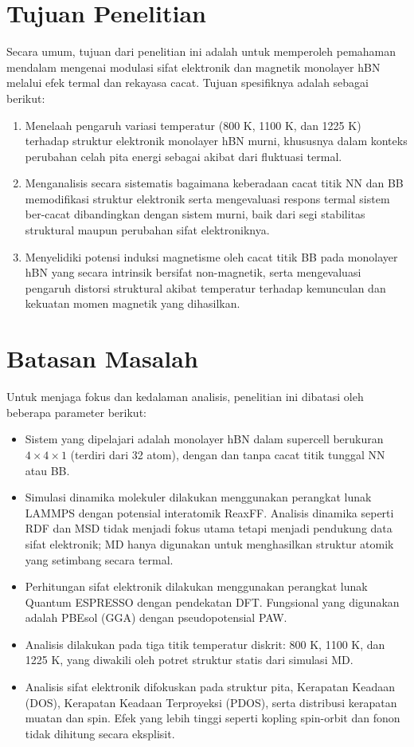 \section{Tujuan Penelitian}
Secara umum, tujuan dari penelitian ini adalah untuk memperoleh pemahaman mendalam mengenai modulasi sifat elektronik dan magnetik monolayer hBN melalui efek termal dan rekayasa cacat. Tujuan spesifiknya adalah sebagai berikut:
\begin{enumerate}
\item Menelaah pengaruh variasi temperatur (800 K, 1100 K, dan 1225 K) terhadap struktur elektronik monolayer hBN murni, khususnya dalam konteks perubahan celah pita energi sebagai akibat dari fluktuasi termal.

\item Menganalisis secara sistematis bagaimana keberadaan cacat titik NN dan BB memodifikasi struktur elektronik serta mengevaluasi respons termal sistem ber-cacat dibandingkan dengan sistem murni, baik dari segi stabilitas struktural maupun perubahan sifat elektroniknya.

\item Menyelidiki potensi induksi magnetisme oleh cacat titik BB pada monolayer hBN yang secara intrinsik bersifat non-magnetik, serta mengevaluasi pengaruh distorsi struktural akibat temperatur terhadap kemunculan dan kekuatan momen magnetik yang dihasilkan.
\end{enumerate}

\section{Batasan Masalah}
Untuk menjaga fokus dan kedalaman analisis, penelitian ini dibatasi oleh beberapa parameter berikut:
\begin{itemize}
    \item Sistem yang dipelajari adalah monolayer hBN dalam supercell berukuran $4 \times 4 \times 1$ (terdiri dari 32 atom), dengan dan tanpa cacat titik tunggal NN atau BB.
    \item Simulasi dinamika molekuler dilakukan menggunakan perangkat lunak LAMMPS dengan potensial interatomik ReaxFF. Analisis dinamika seperti RDF dan MSD tidak menjadi fokus utama tetapi menjadi pendukung data sifat elektronik; MD hanya digunakan untuk menghasilkan struktur atomik yang setimbang secara termal.
    \item Perhitungan sifat elektronik dilakukan menggunakan perangkat lunak Quantum ESPRESSO dengan pendekatan DFT. Fungsional yang digunakan adalah PBEsol (GGA) dengan pseudopotensial PAW.
    \item Analisis dilakukan pada tiga titik temperatur diskrit: 800 K, 1100 K, dan 1225 K, yang diwakili oleh potret struktur statis dari simulasi MD.
    \item Analisis sifat elektronik difokuskan pada struktur pita, Kerapatan Keadaan (DOS), Kerapatan Keadaan Terproyeksi (PDOS), serta distribusi kerapatan muatan dan spin. Efek yang lebih tinggi seperti kopling spin-orbit dan fonon tidak dihitung secara eksplisit.
\end{itemize}

